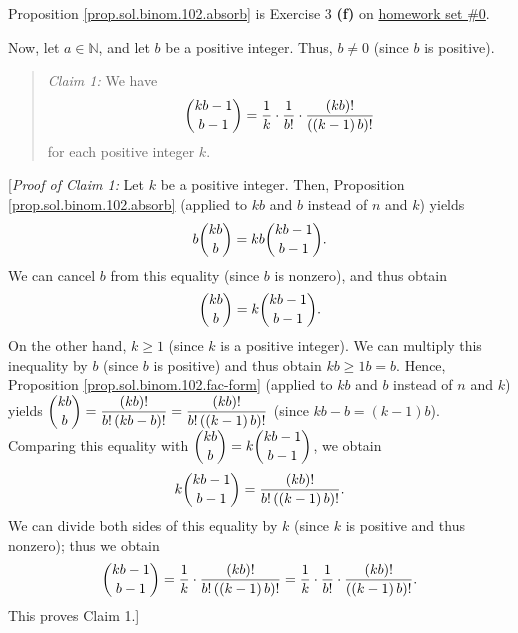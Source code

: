 \documentclass[paper=a4, fontsize=12pt]{scrartcl}%
\theoremstyle{plainsl}
\theoremstyle{definition}
\theoremstyle{remark}
\newenvironment{statement}{\begin{quote}}{\end{quote}}
\begin{document}
Proposition \ref{prop.sol.binom.102.absorb} is Exercise 3 \textbf{(f)} on
\href{http://www.cip.ifi.lmu.de/~grinberg/t/19s/hw0s.pdf}{homework set \#0}.

Now, let $a\in\mathbb{N}$, and let $b$ be a positive integer. Thus, $b\neq0$
(since $b$ is positive).

\begin{statement}
\textit{Claim 1:} We have
\[
\dbinom{kb-1}{b-1}=\dfrac{1}{k}\cdot\dfrac{1}{b!}\cdot\dfrac{\left(
kb\right)  !}{\left(  \left(  k-1\right)  b\right)  !}%
\]
for each positive integer $k$.
\end{statement}

[\textit{Proof of Claim 1:} Let $k$ be a positive integer. Then, Proposition
\ref{prop.sol.binom.102.absorb} (applied to $kb$ and $b$ instead of $n$ and
$k$) yields%
\[
b\dbinom{kb}{b}=kb\dbinom{kb-1}{b-1}.
\]
We can cancel $b$ from this equality (since $b$ is nonzero), and thus obtain%
\[
\dbinom{kb}{b}=k\dbinom{kb-1}{b-1}.
\]
On the other hand, $k\geq1$ (since $k$ is a positive integer). We can multiply
this inequality by $b$ (since $b$ is positive) and thus obtain $kb\geq1b=b$.
Hence, Proposition \ref{prop.sol.binom.102.fac-form} (applied to $kb$ and $b$
instead of $n$ and $k$) yields $\dbinom{kb}{b}=\dfrac{\left(  kb\right)
!}{b!\left(  kb-b\right)  !}=\dfrac{\left(  kb\right)  !}{b!\left(  \left(
k-1\right)  b\right)  !}$ (since $kb-b=\left(  k-1\right)  b$). Comparing this
equality with $\dbinom{kb}{b}=k\dbinom{kb-1}{b-1}$, we obtain%
\[
k\dbinom{kb-1}{b-1}=\dfrac{\left(  kb\right)  !}{b!\left(  \left(  k-1\right)
b\right)  !}.
\]
We can divide both sides of this equality by $k$ (since $k$ is positive and
thus nonzero); thus we obtain%
\[
\dbinom{kb-1}{b-1}=\dfrac{1}{k}\cdot\dfrac{\left(  kb\right)  !}{b!\left(
\left(  k-1\right)  b\right)  !}=\dfrac{1}{k}\cdot\dfrac{1}{b!}\cdot
\dfrac{\left(  kb\right)  !}{\left(  \left(  k-1\right)  b\right)  !}.
\]
This proves Claim 1.]
\end{document}
